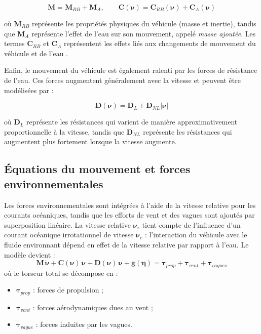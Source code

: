 \documentclass{rapportEILCO}
\begin{document}
\begin{equation} \boldsymbol{M} = \boldsymbol{M}_{RB} + \boldsymbol{M}_{A}, \qquad \boldsymbol{C}(\boldsymbol{\nu}) = \boldsymbol{C}_{RB}(\boldsymbol{\nu}) + \boldsymbol{C}_{A}(\boldsymbol{\nu}) 
\end{equation}

où $\boldsymbol{M}_{RB}$ représente les propriétés physiques du véhicule (masse et inertie), tandis que $\boldsymbol{M}_{A}$ représente l'effet de l'eau sur son mouvement, appelé \textit{masse ajoutée}. Les termes $\boldsymbol{C}_{RB}$ et $\boldsymbol{C}_{A}$ représentent les effets liés aux changements de mouvement du véhicule et de l'eau \cite{bingham19toward,fossen}.

Enfin, le mouvement du véhicule est également ralenti par les forces de résistance de l'eau. Ces forces augmentent généralement avec la vitesse et peuvent être modélisées par :

\begin{equation} \boldsymbol{D}(\boldsymbol{\nu}) = \boldsymbol{D}_L + \boldsymbol{D}_{NL}|\boldsymbol{\nu}| \end{equation}

où $\boldsymbol{D}_{L}$ représente les résistances qui varient de manière approximativement proportionnelle à la vitesse, tandis que $\boldsymbol{D}_{NL}$ représente les résistances qui augmentent plus fortement lorsque la vitesse augmente.

	
	
	\subsection{Équations du mouvement et forces environnementales}
	
	Les forces environnementales sont intégrées à l'aide de la vitesse relative pour les courants
	océaniques, tandis que les efforts de vent et des vagues sont ajoutés par superposition linéaire. La
	vitesse relative $\boldsymbol{\nu}_r$ tient compte de l'influence d'un courant océanique irrotationnel
	de vitesse $\boldsymbol{\nu}_c$ : l'interaction du véhicule avec le fluide environnant dépend en effet
	de la vitesse relative par rapport à l'eau. Le modèle devient :
	\begin{equation}
		\boldsymbol{M}\,\dot{\boldsymbol{\nu}} + \boldsymbol{C}(\boldsymbol{\nu})\,\boldsymbol{\nu}
		+ \boldsymbol{D}(\boldsymbol{\nu})\,\boldsymbol{\nu} + \boldsymbol{g}(\boldsymbol{\eta})
		= \boldsymbol{\tau}_{prop} + \boldsymbol{\tau}_{vent} + \boldsymbol{\tau}_{vagues}
		\label{eq:relatif}
	\end{equation}
	où le torseur total se décompose en :
	\begin{itemize}[label=--]
		\item $\boldsymbol{\tau}_{prop}$ : forces de propulsion ;
		\item $\boldsymbol{\tau}_{vent}$ : forces aérodynamiques dues au vent ;
		\item $\boldsymbol{\tau}_{vague}$ : forces induites par les vagues.
	\end{itemize}
	
\end{document}
